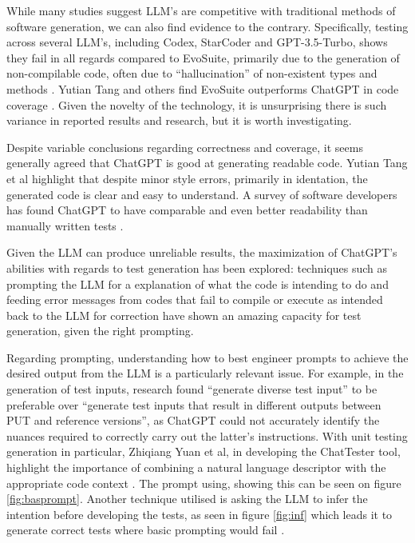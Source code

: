 While many studies suggest LLM's are competitive with traditional methods of software generation, we can also find evidence to the contrary. Specifically, testing across several LLM's, including Codex, StarCoder and GPT-3.5-Turbo, shows they fail in all regards compared to EvoSuite, primarily due to the generation of non-compilable code, often due to ``hallucination'' of non-existent types and methods \citep{kn:siddiq2023empirical}. Yutian Tang and others find EvoSuite outperforms ChatGPT in code coverage \citep{kn:tang2023chatgpt}. Given the novelty of the technology, it is unsurprising there is such variance in reported results and research, but it is worth investigating.

Despite variable conclusions regarding correctness and coverage, it seems generally agreed that ChatGPT is good at generating readable code. Yutian Tang et al highlight that despite minor style errors, primarily in identation, the generated code is clear and easy to understand\citep{kn:tang2023chatgpt}. A survey of software developers has found ChatGPT to have comparable and even better readability than manually written tests \citep{kn:chattester}.


Given the LLM can produce unreliable results, the maximization of ChatGPT's abilities with regards to test generation has been explored: techniques such as prompting the LLM for a explanation of what the code is intending to do \cite{kn:nuances} and feeding error messages from codes that fail to compile or execute as intended back to the LLM for correction \cite{kn:chattester} have shown an amazing capacity for test generation, given the right prompting.

Regarding prompting, understanding how to best engineer prompts to achieve the desired output from the LLM is a particularly relevant issue. For example, in the generation of test inputs, research found “generate diverse test input” to be preferable over “generate test inputs that result in different outputs between PUT and reference versions”, as ChatGPT could not accurately identify the nuances required to correctly carry out the latter's instructions. \citep{kn:nuances}
With unit testing generation in particular, Zhiqiang Yuan et al, in developing the ChatTester tool, highlight the importance of combining a natural language descriptor with the appropriate code context \citep{kn:chattester}. The prompt using, showing this can be seen on figure \ref{fig:basprompt}. Another technique utilised is asking the LLM to infer the intention before developing the tests, as seen in figure \ref{fig:inf} which leads it to generate correct tests where basic prompting would fail \citep{kn:chattester}.



